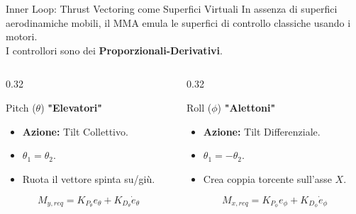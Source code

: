 \documentclass[aspectratio=169]{beamer} %
\begin{document}
\begin{frame}{Inner Loop: Thrust Vectoring come Superfici Virtuali}
    In assenza di superfici aerodinamiche mobili, il MMA emula le superfici di controllo classiche usando i motori.\\
    I controllori sono dei \textbf{Proporzionali-Derivativi}. 

    \vspace{0.15cm}
    \begin{columns}[T]
        \begin{column}{0.32\textwidth}
            \begin{alertblock}{Pitch ($\theta$)}
                \centering \textbf{"Elevatori"}
                \vspace{0.2cm}
                \begin{itemize}
                    \item \textbf{Azione:} Tilt Collettivo.
                    \item $\theta_1 = \theta_2$.
                    \item Ruota il vettore spinta su/giù.
                \end{itemize}
                \begin{equation}
                    M_{y,req} = K_{P_\theta} e_\theta + K_{D_\theta} \dot{e}_{\theta}
                \end{equation}
                
            \end{alertblock}
        \end{column}

        \begin{column}{0.32\textwidth}
            \begin{block}{Roll ($\phi$)}
                \centering \textbf{"Alettoni"}
                \vspace{0.2cm}
                \begin{itemize}
                    \item \textbf{Azione:} Tilt Differenziale.
                    \item $\theta_1 = -\theta_2$.
                    \item Crea coppia torcente sull'asse $X$.
                \end{itemize}
                \begin{equation}
                    M_{x,req} = K_{P_\phi} e_\phi + K_{D_\phi} \dot{e}_{\phi}
                \end{equation}
            \end{block}
        \end{column}


\end{columns}
\end{frame}
\end{document}
